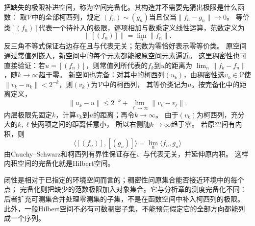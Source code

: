 把缺失的极限补进空间，称为空间完备化。其构造并不需要先猜出极限是什么函数：
取$\mathcal V$中的全部柯西列，规定
$(f_n)\sim(g_n)$当且仅当$\lVert f_n-g_n\rVert\to0$。
等价类$[(f_n)]$代表一个待补入的极限，逐项相加与数乘定义线性运算，范数定义为
\[
 \bigl\lVert[(f_n)]\bigr\rVert=\lim_n\lVert f_n\rVert.
\]
反三角不等式保证右边存在且与代表无关；范数为零恰好表示零等价类。
原空间通过常值列嵌入，新空间中的每个元素都能被原空间元素逼近。
这里稠密性也可直接验证：若$u=[(f_n)]$，则常值列所代表的$f_k$到$u$的距离为
$\lim_n\lVert f_k-f_n\rVert$，随$k\to\infty$趋于零。
新空间也完备：对其中的柯西列$(u_k)$，由稠密性选$v_k\in\mathcal V$使
$\lVert v_k-u_k\rVert<2^{-k}$，则$(v_k)$为$\mathcal V$中的柯西列，
其等价类记为$u$。按完备化中的距离定义，
\[
 \lVert u_k-u\rVert\leq2^{-k}+
 \lim_{\ell\to\infty}\lVert v_k-v_\ell\rVert.
\]
内层极限先固定$k$，计算$v_k$到$u$的距离；再令$k\to\infty$。
由于$(v_k)$为柯西列，充分大的$k,\ell$使两项之间的距离任意小，
所以右侧随$k\to\infty$趋于零。
若原空间有内积，则
\[
 \bigl\langle[(f_n)],[(g_n)]\bigr\rangle
 =\lim_n\langle f_n,g_n\rangle
\]
由Cauchy--Schwarz和柯西列有界性保证存在、与代表无关，并延伸原内积。
这样内积空间的完备化就是Hilbert空间。

闭性是相对于已指定的环境空间而言的；稠密性问原集合能否接近环境中的每个点；
完备化则把缺少的范数极限加入对象集合。它与分析章的测度完备化不同：
后者扩充可测集合并处理零测集的子集，不是在函数空间中补入柯西列的极限。
此外，一般Hilbert空间不必有可数稠密子集，不能预先假定它的全部方向都能列成一个序列。



